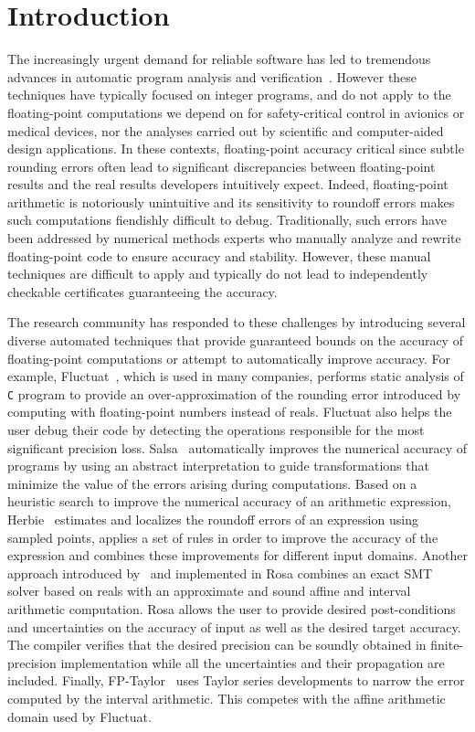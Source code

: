 \documentclass[main.tex]{subfiles}
\begin{document}
\section{Introduction}
\label{sec:intro}

The increasingly urgent demand for reliable software has led to tremendous
advances in automatic program analysis and verification~.
However these techniques have typically focused on integer programs, and do
not apply to the floating-point computations we depend on for
safety-critical control in avionics or medical devices, nor the analyses
carried out by scientific and computer-aided design applications.  In these
contexts, floating-point accuracy critical since subtle rounding errors
often lead to significant discrepancies between floating-point results and
the real results developers intuitively expect.  Indeed, floating-point
arithmetic is notoriously unintuitive and its sensitivity to roundoff
errors makes such computations fiendishly difficult to debug.
Traditionally, such errors have been addressed by numerical methods experts
who manually analyze and rewrite floating-point code to ensure accuracy and
stability.  However, these manual techniques are difficult to apply and
typically do not lead to independently checkable certificates guaranteeing
the accuracy.

The research community has responded to these challenges by introducing
several diverse automated techniques that provide guaranteed bounds on the
accuracy of floating-point computations or attempt to automatically improve
accuracy.  For example, Fluctuat~\cite{Goubault13,GMP06}, which is used in
many companies, performs static analysis of \texttt{C} program to provide
an over-approximation of the rounding error introduced by computing with
floating-point numbers instead of reals.  Fluctuat also helps the user
debug their code by detecting the operations responsible for the most
significant precision loss.  Salsa~\cite{fmics15} automatically improves
the numerical accuracy of programs by using an abstract interpretation to
guide transformations that minimize the value of the errors arising during
computations.  Based on a heuristic search to improve the numerical
accuracy of an arithmetic expression, Herbie~\cite{pavel15} estimates and
localizes the roundoff errors of an expression using sampled points,
applies a set of rules in order to improve the accuracy of the expression
and combines these improvements for different input domains.  Another
approach introduced by~\cite{DarulovaK14} and implemented in Rosa combines
an exact SMT solver based on reals with an approximate and sound affine and
interval arithmetic computation.  Rosa allows the user to provide desired
post-conditions and uncertainties on the accuracy of input as well as the
desired target accuracy.  The compiler verifies that the desired precision
can be soundly obtained in finite-precision implementation while all the
uncertainties and their propagation are included.  Finally,
FP-Taylor~\cite{fptaylor-fm15} uses Taylor series developments to narrow
the error computed by the interval arithmetic.  This competes with the
affine arithmetic domain used by Fluctuat.
\end{document}
